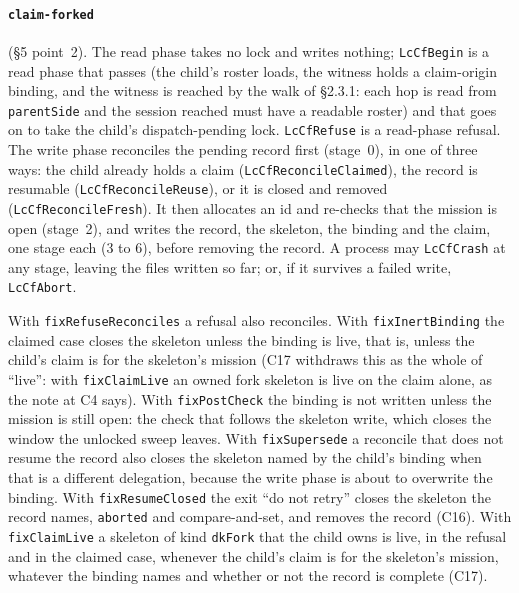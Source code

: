 \documentclass[a4paper,10pt,fleqn]{article}
\newcommand{\field}[1]{\texttt{#1}}
\begin{document}
\paragraph{\field{claim-forked}} (\S5 point~2). The read phase takes no lock
and writes nothing; \field{LcCfBegin} is a read phase that passes (the
child's roster loads, the witness holds a claim-origin binding, and the
witness is reached by the walk of \S2.3.1: each hop is read from
\field{parentSide} and the session reached must have a readable roster) and
that goes on to take the child's dispatch-pending lock. \field{LcCfRefuse}
is a read-phase refusal. The write phase reconciles the pending record
first (stage~0), in one of three ways: the child already holds a claim
(\field{LcCfReconcileClaimed}), the record is resumable
(\field{LcCfReconcileReuse}), or it is closed and removed
(\field{LcCfReconcileFresh}). It then allocates an id and re-checks that
the mission is open (stage~2), and writes the record, the skeleton, the
binding and the claim, one stage each (3 to 6), before removing the
record. A process may \field{LcCfCrash} at any stage, leaving the files
written so far; or, if it survives a failed write, \field{LcCfAbort}.

With \field{fixRefuseReconciles} a refusal also reconciles. With
\field{fixInertBinding} the claimed case closes the skeleton unless the
binding is live, that is, unless the child's claim is for the skeleton's
mission (C17 withdraws this as the whole of ``live'': with
\field{fixClaimLive} an owned fork skeleton is live on the claim alone, as
the note at C4 says). With \field{fixPostCheck} the binding is not written unless the
mission is still open: the check that follows the skeleton write, which
closes the window the unlocked sweep leaves. With \field{fixSupersede} a
reconcile that does not resume the record also closes the skeleton named by
the child's binding when that is a different delegation, because the write
phase is about to overwrite the binding. With
\field{fixResumeClosed} the exit ``do not retry'' closes the skeleton the
record names, \field{aborted} and compare-and-set, and removes the record
(C16). With \field{fixClaimLive} a skeleton of kind \field{dkFork} that the
child owns is live, in the refusal and in the claimed case, whenever the
child's claim is for the skeleton's mission, whatever the binding names and
whether or not the record is complete (C17).
\end{document}
